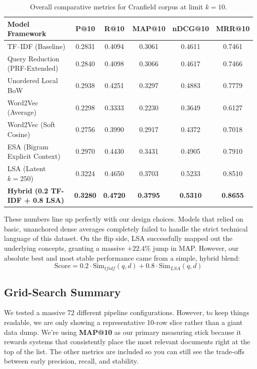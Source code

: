 \documentclass[runningheads]{llncs}
\begin{document}
\begin{table}[h]
\centering
\begin{tabular}{lccccc}
\toprule
\textbf{Model Framework} & \textbf{P@10} & \textbf{R@10} & \textbf{MAP@10} & \textbf{nDCG@10} & \textbf{MRR@10} \\
\midrule
TF--IDF (Baseline) & 0.2831 & 0.4094 & 0.3061 & 0.4611 & 0.7461 \\
Query Reduction (PRF-Extended) & 0.2840 & 0.4098 & 0.3066 & 0.4617 & 0.7466 \\
Unordered Local BoW & 0.2938 & 0.4251 & 0.3297 & 0.4883 & 0.7779 \\
Word2Vec (Average) & 0.2298 & 0.3333 & 0.2230 & 0.3649 & 0.6127 \\
Word2Vec (Soft Cosine) & 0.2756 & 0.3990 & 0.2917 & 0.4372 & 0.7018 \\
ESA (Bigram Explicit Context) & 0.2970 & 0.4430 & 0.3431 & 0.4905 & 0.7910 \\
LSA (Latent $k=250$) & 0.3224 & 0.4650 & 0.3703 & 0.5233 & 0.8510 \\
\midrule
\textbf{Hybrid (0.2 TF-IDF + 0.8 LSA)} & \textbf{0.3280} & \textbf{0.4720} & \textbf{0.3795} & \textbf{0.5310} & \textbf{0.8655} \\
\bottomrule
\end{tabular}
\caption{Overall comparative metrics for Cranfield corpus at limit $k=10$.}
\label{tab:results}
\end{table}

These numbers line up perfectly with our design choices. Models that relied on basic, unanchored dense averages completely failed to handle the strict technical language of this dataset. On the flip side, LSA successfully mapped out the underlying concepts, granting a massive $+22.4\%$ jump in MAP. However, our absolute best and most stable performance came from a simple, hybrid blend:
\begin{equation}
\text{Score} = 0.2 \cdot \text{Sim}_{tfidf}(q,d) + 0.8 \cdot \text{Sim}_{LSA}(q,d)
\end{equation}

\subsection{Grid-Search Summary}

We tested a massive 72 different pipeline configurations. However, to keep things readable, we are only showing a representative 10-row slice rather than a giant data dump. We're using \textbf{MAP@10} as our primary measuring stick because it rewards systems that consistently place the most relevant documents right at the top of the list. The other metrics are included so you can still see the trade-offs between early precision, recall, and stability.
\end{document}
